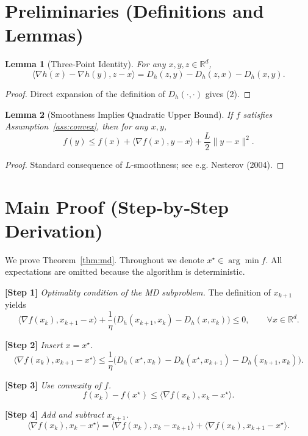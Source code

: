 \documentclass{article}
\newtheorem{lemma}{Lemma}
\newcommand{\inner}[2]{\langle #1,#2\rangle}
\newcommand{\grad}{\nabla}
\newcommand{\D}[2]{D_{h}(#1,#2)}
\begin{document}
\section*{Preliminaries (Definitions and Lemmas)}
\begin{lemma}[Three‑Point Identity]\label{lem:3pt}
For any $x,y,z\in\mathbb{R}^{d}$,
\[
\inner{\grad h(x)-\grad h(y)}{z-x}
= \D{z}{y}-\D{z}{x}-\D{x}{y}.
\tag{2}
\]
\end{lemma}
\begin{proof}
Direct expansion of the definition of $\D{\cdot}{\cdot}$ gives (2). \qedhere
\end{proof}

\begin{lemma}[Smoothness Implies Quadratic Upper Bound]\label{lem:smooth}
If $f$ satisfies Assumption~\ref{ass:convex}, then for any $x,y$,
\[
f(y)\le f(x)+\inner{\grad f(x)}{y-x}+\frac{L}{2}\|y-x\|^{2}.
\tag{3}
\]
\end{lemma}
\begin{proof}
Standard consequence of $L$‑smoothness; see e.g. Nesterov (2004). \qedhere
\end{proof}

\section*{Main Proof (Step‑by‑Step Derivation)}
We prove Theorem~\ref{thm:md}.  Throughout we denote $x^{\star}\in\arg\min f$.
All expectations are omitted because the algorithm is deterministic.

\medskip
\noindent\textbf{[Step 1]} \emph{Optimality condition of the MD subproblem.}
The definition of $x_{k+1}$ yields
\[
\inner{\grad f(x_{k})}{x_{k+1}-x}
+\frac{1}{\eta}\bigl(\D{x_{k+1}}{x_{k}}-\D{x}{x_{k}}\bigr)\le 0,
\qquad\forall x\in\mathbb{R}^{d}.
\tag{4}
\]

\noindent\textbf{[Step 2]} \emph{Insert $x=x^{\star}$.}
\[
\inner{\grad f(x_{k})}{x_{k+1}-x^{\star}}
\le \frac{1}{\eta}\bigl(\D{x^{\star}}{x_{k}}-\D{x^{\star}}{x_{k+1}}-\D{x_{k+1}}{x_{k}}\bigr).
\tag{5}
\]

\noindent\textbf{[Step 3]} \emph{Use convexity of $f$.}
\[
f(x_{k})-f(x^{\star})\le \inner{\grad f(x_{k})}{x_{k}-x^{\star}}.
\tag{6}
\]

\noindent\textbf{[Step 4]} \emph{Add and subtract $x_{k+1}$.}
\[
\inner{\grad f(x_{k})}{x_{k}-x^{\star}}
= \inner{\grad f(x_{k})}{x_{k}-x_{k+1}}
   +\inner{\grad f(x_{k})}{x_{k+1}-x^{\star}}.
\tag{7}
\]
\end{document}
